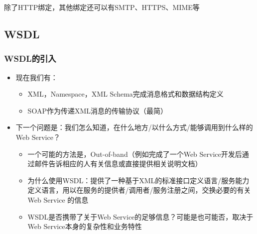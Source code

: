 除了HTTP绑定，其他绑定还可以有SMTP、HTTPS、MIME等

\subsection{WSDL}

\subsubsection{WSDL的引入}
\begin{itemize}
    \item 现在我们有：
    \begin{itemize}
        \item XML，Namespace，XML Schema完成消息格式和数据结构定义
        \item SOAP作为传递XML消息的传输协议（最简）
    \end{itemize}
    \item 下一个问题是：我们怎么知道，在什么地方/以什么方式/能够调用到什么样的Web Service？
    \begin{itemize}
        \item 一个可能的方法是，Out-of-band（例如完成了一个Web Service开发后通过邮件告诉相应的人有关信息或直接提供相关说明文档）
        \item 为什么使用WSDL：提供了一种基于XML的标准接口定义语言/服务能力定义语言，用以在服务的提供者/调用者/服务注册之间，交换必要的有关Web Service 的信息
        \item WSDL是否携带了关于Web Service的足够信息？可能是也可能否，取决于Web Service本身的复杂性和业务特性
    \end{itemize}
\end{itemize}

